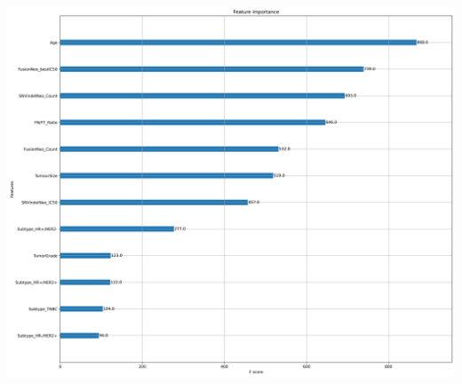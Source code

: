 \documentclass[
  letterpaper,
  DIV=11,
  numbers=noendperiod]{scrartcl}
\begin{document}
\includegraphics[width=49.80208in,height=41.09375in]{xgboost_tuned_files/figure-pdf/cell-41-output-3.png}
\end{document}

